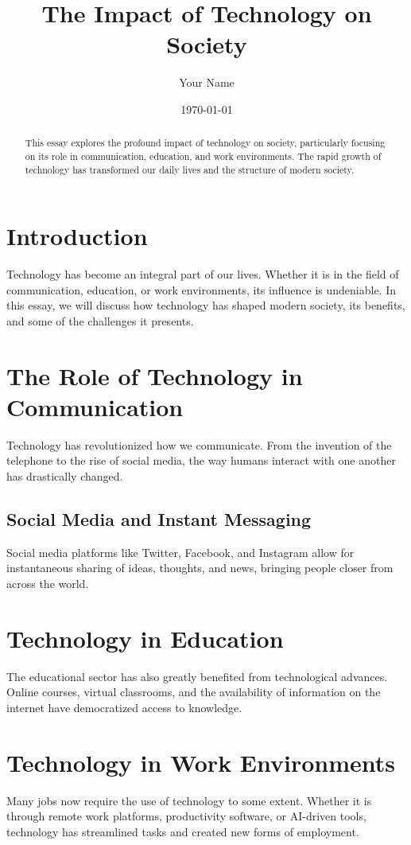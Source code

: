 \documentclass[12pt]{article}  %
\title{The Impact of Technology on Society}  %
\author{Your Name}                           %
\date{\today}                                %
\begin{document}
	
	\maketitle                                   %
	
	\begin{abstract}
		This essay explores the profound impact of technology on society, particularly focusing on its role in communication, education, and work environments. The rapid growth of technology has transformed our daily lives and the structure of modern society.
	\end{abstract}
	
	\section{Introduction}
	Technology has become an integral part of our lives. Whether it is in the field of communication, education, or work environments, its influence is undeniable. In this essay, we will discuss how technology has shaped modern society, its benefits, and some of the challenges it presents.
	
	\section{The Role of Technology in Communication}
	Technology has revolutionized how we communicate. From the invention of the telephone to the rise of social media, the way humans interact with one another has drastically changed.
	
	\subsection{Social Media and Instant Messaging}
	Social media platforms like Twitter, Facebook, and Instagram allow for instantaneous sharing of ideas, thoughts, and news, bringing people closer from across the world.
	
	\section{Technology in Education}
	The educational sector has also greatly benefited from technological advances. Online courses, virtual classrooms, and the availability of information on the internet have democratized access to knowledge.
	
	\section{Technology in Work Environments}
	Many jobs now require the use of technology to some extent. Whether it is through remote work platforms, productivity software, or AI-driven tools, technology has streamlined tasks and created new forms of employment.
	
\end{document}
